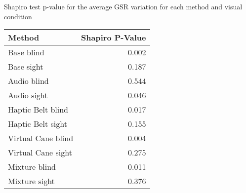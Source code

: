 
\centering
\caption{Shapiro test p-value for the average GSR variation for each method and visual condition}
\label{tab:shapiro_gsr_avg}
\begin{tabular}{lr}
\toprule
            Method &  Shapiro P-Value \\
\midrule
        Base blind &            0.002 \\
        Base sight &            0.187 \\
       Audio blind &            0.544 \\
       Audio sight &            0.046 \\
 Haptic Belt blind &            0.017 \\
 Haptic Belt sight &            0.155 \\
Virtual Cane blind &            0.004 \\
Virtual Cane sight &            0.275 \\
     Mixture blind &            0.011 \\
     Mixture sight &            0.376 \\
\bottomrule
\end{tabular}
